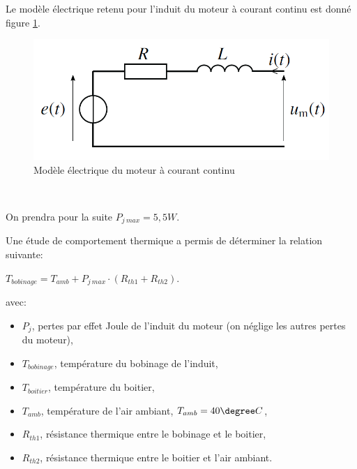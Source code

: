 Le modèle électrique retenu pour l'induit du moteur à courant continu est donné figure \ref{img08}.


\begin{figure}[!h]
 \centering\includegraphics[width=0.6\linewidth]{img/img08}
 \caption{Modèle électrique du moteur à courant continu}
 \label{img08}
\end{figure}



~\

On prendra pour la suite $P_{j\ max}=5,5W$.

\newpage

Une étude de comportement thermique a permis de déterminer la relation suivante:
\begin{center}
$T_{bobinage}=T_{amb}+P_{j\ max}\cdot (R_{th1}+R_{th2})$.
\end{center}

avec:
\begin{itemize}
 \item $P_j$, pertes par effet Joule de l'induit du moteur (on néglige les autres pertes du moteur),
 \item $T_{bobinage}$, température du bobinage de l'induit,
 \item $T_{boitier}$, température du boitier,
 \item $T_{amb}$, température de l'air ambiant, $T_{amb}=40\degree C$,
 \item $R_{th1}$, résistance thermique entre le bobinage et le boitier,
 \item $R_{th2}$, résistance thermique entre le boitier et l'air ambiant.
\end{itemize}

